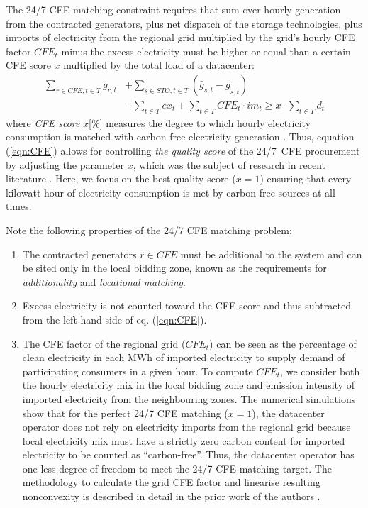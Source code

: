 The 24/7 CFE matching constraint requires that sum over hourly generation from the contracted generators, plus net dispatch of the storage technologies, plus imports of electricity from the regional grid multiplied by the grid's hourly CFE factor $CFE_t$ minus the excess electricity must be higher or equal than a certain CFE score $x$ multiplied by the total load of a datacenter:
\begin{equation}
    \begin{split}
        \sum_{r\in CFE, t\in T} g_{r,t} &+ \sum_{s\in STO, t\in T} \left(\bar{g}_{s,t} - \underline{g}_{s,t}\right) \\
        &- \sum_{t\in T} ex_t + \sum_{t\in T} CFE_t \cdot im_t \geq x \cdot \sum_{t\in T} d_t
    \end{split}
\label{eqn:CFE}
\end{equation}
\noindent where \textit{CFE score} $x$[\%] measures the degree to which hourly electricity consumption is matched with carbon-free electricity generation \cite{google-methodologies}. Thus, equation (\ref{eqn:CFE}) allows for controlling \textit{the quality score} of the 24/7~CFE procurement by adjusting the parameter $x$, which was the subject of research in recent literature \cite{riepinMeansCostsSystemlevel2023,xu-247CFE-report}. Here, we focus on the best quality score ($x=1$) ensuring that every kilowatt-hour of electricity consumption is met by carbon-free sources at all times.

Note the following properties of the 24/7 CFE matching problem:

\begin{enumerate}
    \item The contracted generators $r\in CFE$ must be additional to the system and can be sited only in the local bidding zone, known as the requirements for \textit{additionality} and \textit{locational matching}.
    \item Excess electricity is not counted toward the CFE score and thus subtracted from the left-hand side of eq. (\ref{eqn:CFE}).
    \item The CFE factor of the regional grid ($CFE_t$) can be seen as the percentage of clean electricity in each MWh of imported electricity to supply demand of participating consumers in a given hour.
    To compute $CFE_t$, we consider both the hourly electricity mix in the local bidding zone and emission intensity of imported electricity from the neighbouring zones.
    The numerical simulations show that for the perfect 24/7 CFE matching ($x=1$), the datacenter operator does not rely on electricity imports from the regional grid because local electricity mix must have a strictly zero carbon content for imported electricity to be counted as \enquote{carbon-free}.
    Thus, the datacenter operator has one less degree of freedom to meet the 24/7 CFE matching target.
    The methodology to calculate the grid CFE factor and linearise resulting nonconvexity is described in detail in the prior work of the authors \cite{riepin-zenodo-systemlevel247}.
\end{enumerate}

